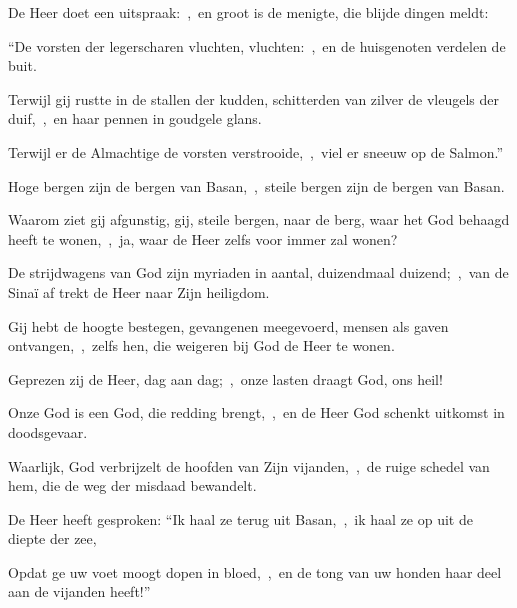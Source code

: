 \documentclass[12pt,twoside,a5paper]{article}
\begin{document}

\begin{halfparskip}
  De Heer doet een uitspraak:~\sep\ en groot is de menigte, die blijde dingen meldt:

  ``De vorsten der legerscharen vluchten, vluchten:~\sep\ en de huisgenoten verdelen de buit.

  Terwijl gij rustte in de stallen der kudden, schitterden van zilver de vleugels der duif,~\sep\ en haar pennen in goudgele glans.

  Terwijl er de Almachtige de vorsten verstrooide,~\sep\ viel er sneeuw op de Salmon.''
\end{halfparskip}


\begin{halfparskip}
  Hoge bergen zijn de bergen van Basan,~\sep\ steile bergen zijn de bergen van Basan.

  Waarom ziet gij afgunstig, gij, steile bergen, naar de berg, waar het God behaagd heeft te wonen,~\sep\ ja, waar de Heer zelfs voor immer zal wonen?

  De strijdwagens van God zijn myriaden in aantal, duizendmaal duizend;~\sep\ van de Sinaï af trekt de Heer naar Zijn heiligdom.

  Gij hebt de hoogte bestegen, gevangenen meegevoerd, mensen als gaven ontvangen,~\sep\ zelfs hen, die weigeren bij God de Heer te wonen.
\end{halfparskip}


\begin{halfparskip}
  Geprezen zij de Heer, dag aan dag;~\sep\ onze lasten draagt God, ons heil!

  Onze God is een God, die redding brengt,~\sep\ en de Heer God schenkt uitkomst in doodsgevaar.

  Waarlijk, God verbrijzelt de hoofden van Zijn vijanden,~\sep\ de ruige schedel van hem, die de weg der misdaad bewandelt.

  De Heer heeft gesproken: ``Ik haal ze terug uit Basan,~\sep\ ik haal ze op uit de diepte der zee,

  Opdat ge uw voet moogt dopen in bloed,~\sep\ en de tong van uw honden haar deel aan de vijanden heeft!''
\end{halfparskip}

\end{document}

